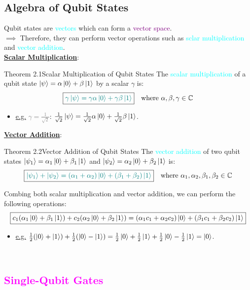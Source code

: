\documentclass{book}
\begin{document}
\subsection{Algebra of Qubit States}
Qubit states are \textcolor{cyan}{vectors} which can form a \textcolor{purple}{vector space}. \\
$\implies$ Therefore, they can perform vector operations such as \textcolor{cyan}{sclar multiplication} and \textcolor{cyan}{vector addition}.\\
\newpage
\uline{\textbf{Scalar Multiplication}}:
\begin{thmBox}{Theorem 2.1}{Scalar Multiplication of Qubit States}
    The \textcolor{cyan}{scalar multiplication} of a qubit state \textcolor{brown}{\(\ket{\psi} = \alpha \ket{0} + \beta \ket{1}\)} by a scalar \(\gamma\) is:
    \[
    \boxed{\textcolor{teal}{\gamma \ket{\psi} = \gamma \alpha \ket{0} + \gamma \beta \ket{1}}} \quad \text{where } \alpha, \beta, \gamma \in \mathbb{C}
    \]
\end{thmBox}
\begin{itemize}
    \item \uline{e.g.} \textcolor{gray}{\(\gamma = \frac{1}{\sqrt{2}}\)}: \textcolor{forestgreen}{\(\frac{1}{\sqrt{2}} \ket{\psi} = \frac{1}{\sqrt{2}} \alpha \ket{0} + \frac{1}{\sqrt{2}} \beta \ket{1}\)}.
\end{itemize}
\uline{\textbf{Vector Addition}}:
\begin{thmBox}{Theorem 2.2}{Vector Addition of Qubit States}
    The \textcolor{cyan}{vector addition} of two qubit states \textcolor{brown}{\(\ket{\psi_1} = \alpha_1 \ket{0} + \beta_1 \ket{1}\)} and \textcolor{brown}{\(\ket{\psi_2} = \alpha_2 \ket{0} + \beta_2 \ket{1}\)} is:
    \[
    \boxed{\textcolor{teal}{\ket{\psi_1} + \ket{\psi_2} = (\alpha_1 + \alpha_2) \ket{0} + (\beta_1 + \beta_2) \ket{1}}} \quad \text{where } \alpha_1, \alpha_2, \beta_1, \beta_2 \in \mathbb{C}
    \]
\end{thmBox}
Combing both scalar multiplication and vector addition, we can perform the following operations:
\[
    \boxed{c_1(\alpha_1 \ket{0} + \beta_1 \ket{1}) + c_2(\alpha_2 \ket{0} + \beta_2 \ket{1}) = (\alpha_1 c_1 + \alpha_2 c_2) \ket{0} + (\beta_1 c_1 + \beta_2 c_2) \ket{1}}
\]
\begin{itemize}
    \item \uline{e.g.} \textcolor{forestgreen}{\(\frac{1}{2} (\ket{0} + \ket{1}) + \frac{1}{2} (\ket{0} - \ket{1}) = \frac{1}{2} \ket{0} + \frac{1}{2} \ket{1} + \frac{1}{2} \ket{0} - \frac{1}{2} \ket{1} = \ket{0}\)}.
\end{itemize}
\\
\textcolor{magenta}{\section{\textbf{Single-Qubit Gates}}}
\end{document}

